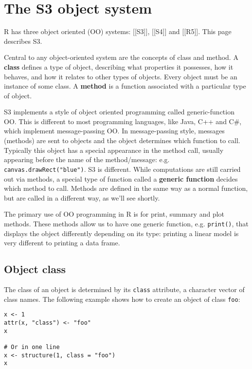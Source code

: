 \chapter{The S3 object system}

R has three object oriented (OO) systems: {[}{[}S3{]}{]}, {[}{[}S4{]}{]}
and {[}{[}R5{]}{]}. This page describes S3.

Central to any object-oriented system are the concepts of class and
method. A \textbf{class} defines a type of object, describing what
properties it possesses, how it behaves, and how it relates to other
types of objects. Every object must be an instance of some class. A
\textbf{method} is a function associated with a particular type of
object.

S3 implements a style of object oriented programming called
generic-function OO. This is different to most programming languages,
like Java, C++ and C\#, which implement message-passing OO. In
message-passing style, messages (methods) are sent to objects and the
object determines which function to call. Typically this object has a
special appearance in the method call, usually appearing before the name
of the method/message: e.g. \texttt{canvas.drawRect("blue")}. S3 is
different. While computations are still carried out via methods, a
special type of function called a \textbf{generic function} decides
which method to call. Methods are defined in the same way as a normal
function, but are called in a different way, as we'll see shortly.

The primary use of OO programming in R is for print, summary and plot
methods. These methods allow us to have one generic function, e.g.
\texttt{print()}, that displays the object differently depending on its
type: printing a linear model is very different to printing a data
frame.

\section{Object class}

The class of an object is determined by its \texttt{class} attribute, a
character vector of class names. The following example shows how to
create an object of class \texttt{foo}:

\begin{verbatim}
x <- 1
attr(x, "class") <- "foo"
x

# Or in one line
x <- structure(1, class = "foo")
x
\end{verbatim}

